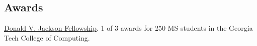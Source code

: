 \subsection*{\textbf{Awards}}
\href{https://sites.gatech.edu/gtcomputingawards2021/graduate-student-awards/}{Donald V. Jackson Fellowship}. 1 of 3 awards for 250 MS students in the Georgia Tech College of Computing.
